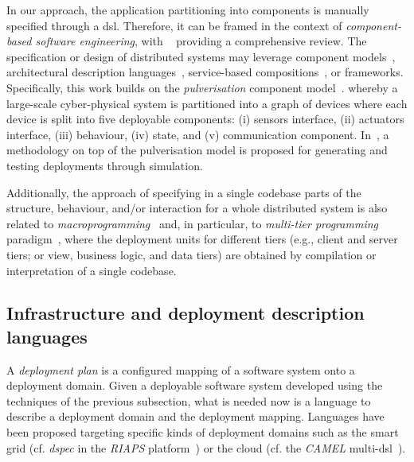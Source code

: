 \documentclass[conference]{IEEEtran}
\begin{document}
In our approach, the application partitioning into components is manually specified through a \ac{dsl}.
%
Therefore, it can be framed in the context of \emph{component-based software engineering},
 with ~\cite{vale2016component-based-se} providing a comprehensive review.
%
The specification or design of distributed systems
 may leverage
 component models~\cite{DBLP:journals/tse/CrnkovicSVC11},
 architectural description languages~\cite{DBLP:journals/tse/MedvidovicT00},
 service-based compositions~\cite{DBLP:journals/csur/LemosDB16}, 
 or frameworks.
%
Specifically,
 this work builds on the \emph{pulverisation} component model~\cite{FI2020-pulverization,IEEE-IoTJ-pulverization-simulation}.
 whereby a large-scale cyber-physical system
 is partitioned into a graph of devices
 where each device is split into five deployable components:
 (i) sensors interface,
 (ii) actuators interface,
 (iii) behaviour,
 (iv) state, and
 (v) communication component.
%
In~\cite{IEEE-IoTJ-pulverization-simulation},
 a methodology on top of the pulverisation model
 is proposed
 for generating and testing deployments through simulation.

Additionally,
 the approach of specifying in a single codebase 
 parts of the structure, behaviour, and/or interaction 
 for a whole distributed system
 is also related to \emph{macroprogramming}~\cite{Casadei2023macro}
 and, in particular, to \emph{multi-tier programming} paradigm~\cite{DBLP:journals/csur/WeisenburgerWS20},
 where the deployment units for different tiers
(e.g., client and server tiers; or view, business logic, and data tiers)
are obtained by compilation or interpretation of a single codebase.

\subsection{Infrastructure and deployment description languages}
\label{sec:rw:depdesc}

A \emph{deployment plan} is a configured mapping of a software system onto a deployment domain.
%
Given a deployable software system
developed using the techniques of the previous subsection,
 what is needed now is a language to describe a deployment domain
 and the deployment mapping.
%
Languages have been proposed
 targeting specific kinds of deployment domains
 such as the smart grid (cf. \emph{dspec} in the \emph{RIAPS} platform~\cite{DBLP:conf/coins/GhoshTKKL22})
 or the cloud (cf. the \emph{CAMEL} multi-\ac{dsl}~\cite{DBLP:journals/jcloudc/AchilleosKRKDOS19}).
\end{document}
